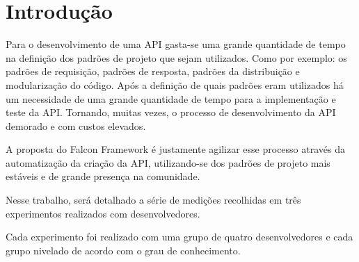 \chapter[Introdução]{Introdução}\label{cap1}

Para o desenvolvimento de uma API gasta-se uma grande quantidade de tempo na definição dos padrões de projeto que sejam utilizados. Como por exemplo: os padrões de requisição, padrões de resposta, padrões da distribuição e modularização do código. Após a definição de quais padrões eram utilizados há um necessidade de uma grande quantidade de tempo para a implementação e teste da API. Tornando, muitas vezes, o processo de desenvolvimento da API demorado e com custos elevados.

A proposta do Falcon Framework é justamente agilizar esse processo através da automatização da criação da API, utilizando-se dos padrões de projeto mais estáveis e de grande presença na comunidade.

Nesse trabalho, será detalhado a série de medições recolhidas em três experimentos
realizados com desenvolvedores.

Cada experimento foi realizado com uma grupo de quatro desenvolvedores e cada grupo nivelado
de acordo com o grau de conhecimento.
